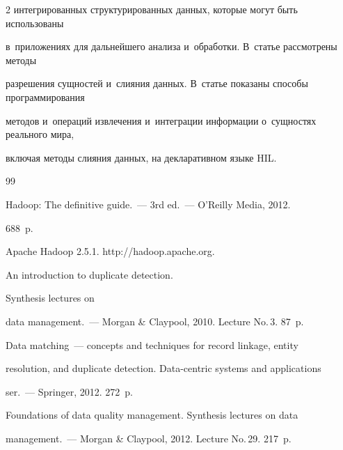 \begin{multicols}{2}
интегрированных структурированных данных, которые могут быть использованы

в~приложениях для дальнейшего анализа и~обработки. В~статье рассмотрены методы

разрешения сущностей и~слияния данных. В~статье показаны способы программирования

методов и~операций извлечения и~интеграции информации о~сущностях реального мира,

включая методы слияния данных, на декларативном языке HIL.





{\small\frenchspacing

 {%


 \begin{thebibliography}{99}


 Hadoop: The definitive guide.~--- 3rd ed.~--- O'Reilly Media, 2012.

688~p.


Apache Hadoop 2.5.1. {\sf http://hadoop.apache.org}.




 An introduction to duplicate detection.

Synthesis lectures on

data management.~--- Morgan \& Claypool, 2010. Lecture No.\,3. 87~p.




 Data matching~---  concepts and techniques for record linkage, entity

resolution, and duplicate detection. Data-centric systems and applications

ser.~--- Springer, 2012. 272~p.




 Foundations of data quality management. Synthesis lectures on data

management.~--- Morgan \& Claypool, 2012. Lecture No.\,29. 217~p.







\end{thebibliography}}}
\end{multicols}
